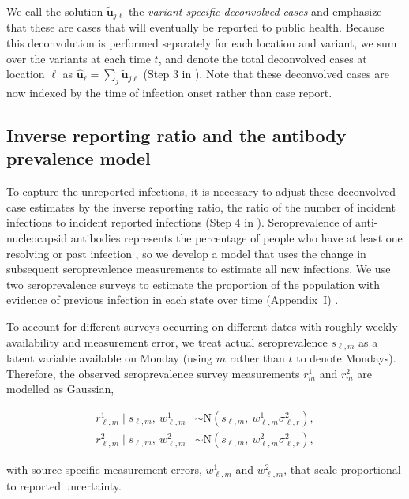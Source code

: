 We call the solution $\widetilde{\mathbf{u}}_{j\ell}$ the \emph{variant-specific
deconvolved cases} and emphasize that these are cases that will eventually be
reported to public health. Because this deconvolution is performed separately
for each location and variant, we sum over the variants at each time $t$, and
denote the total deconvolved cases at location $\ell$ as
$\widehat{\mathbf{u}}_\ell = \sum_j \widetilde{\mathbf{u}}_{j\ell}$ (Step 3 in
). Note that these deconvolved cases are now
indexed by the time of infection onset rather than case report.




\subsection{Inverse reporting ratio and the antibody prevalence model} 
\label{sec:report-ratio}

To capture the unreported infections, it is necessary to adjust these
deconvolved case estimates by the inverse reporting ratio, the ratio of the
number of incident infections to incident reported infections (Step 4 in
). Seroprevalence of anti-nucleocapsid
antibodies represents the percentage of people who have at least one resolving
or past infection \citep{cdc2020data}, so we develop a model that uses the
change in subsequent seroprevalence measurements to estimate all new infections. 
We use two seroprevalence surveys to estimate the proportion of the
population with evidence of previous infection in each state over time  %
(Appendix~I) \citep{cdc2021blood, cdc2021comm}.

To account
for different surveys occurring on different dates with roughly weekly
availability and measurement error, we treat actual seroprevalence $s_{\ell,m}$
as a latent variable available on Monday (using $m$ rather than $t$ to denote
Mondays). Therefore, the observed seroprevalence survey measurements $r^1_m$ and
$r^2_m$ are modelled as Gaussian,
\begin{linenomath*}
\begin{align}
\label{eq:sero-measurements}
r^1_{\ell,m} \mid s_{\ell,m},\ w^1_{\ell,m} &\sim \textrm{N}(s_{\ell,m},\ w^1_{\ell,m}\sigma^2_{\ell,r}),\\
r^2_{\ell,m} \mid s_{\ell,m},\  w^2_{\ell,m}
  &\sim \textrm{N}(s_{\ell,m},\ w^2_{\ell,m}\sigma^2_{\ell,r}),
\end{align}
\end{linenomath*}
with source-specific measurement errors, $w^1_{\ell,m}$ and $w^2_{\ell,m}$, that
scale proportional to reported uncertainty.

